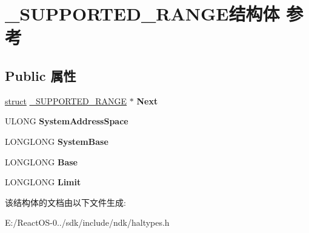 \hypertarget{struct___s_u_p_p_o_r_t_e_d___r_a_n_g_e}{}\section{\+\_\+\+S\+U\+P\+P\+O\+R\+T\+E\+D\+\_\+\+R\+A\+N\+G\+E结构体 参考}
\label{struct___s_u_p_p_o_r_t_e_d___r_a_n_g_e}
\subsection*{Public 属性}
\begin{DoxyCompactItemize}
\item 
\mbox{\label{struct___s_u_p_p_o_r_t_e_d___r_a_n_g_e_affaa23ca91d03dcab9772ec4d374c9c5}} 
\hyperlink{interfacestruct}{struct} \hyperlink{struct___s_u_p_p_o_r_t_e_d___r_a_n_g_e}{\+\_\+\+S\+U\+P\+P\+O\+R\+T\+E\+D\+\_\+\+R\+A\+N\+GE} $\ast$ {\bfseries Next}
\item 
\mbox{\label{struct___s_u_p_p_o_r_t_e_d___r_a_n_g_e_a09906f5fa15ef67c56cc25240e8eee05}} 
U\+L\+O\+NG {\bfseries System\+Address\+Space}
\item 
\mbox{\label{struct___s_u_p_p_o_r_t_e_d___r_a_n_g_e_a11857852cedc9f33bf98a36332ad1db0}} 
L\+O\+N\+G\+L\+O\+NG {\bfseries System\+Base}
\item 
\mbox{\label{struct___s_u_p_p_o_r_t_e_d___r_a_n_g_e_a2338cefffb9ed25c764823d06e069ab5}} 
L\+O\+N\+G\+L\+O\+NG {\bfseries Base}
\item 
\mbox{\label{struct___s_u_p_p_o_r_t_e_d___r_a_n_g_e_a53acd8cd3e9632c3097fb99d99810903}} 
L\+O\+N\+G\+L\+O\+NG {\bfseries Limit}
\end{DoxyCompactItemize}


该结构体的文档由以下文件生成\+:\begin{DoxyCompactItemize}
\item 
E\+:/\+React\+O\+S-\/0../sdk/include/ndk/haltypes.\+h\end{DoxyCompactItemize}
